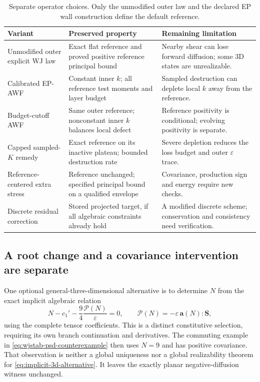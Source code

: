 \documentclass[11pt,a4paper]{article}
\numberwithin{equation}{section}
\newcommand{\eps}{\varepsilon}
\begin{document}
\begin{table}[htbp]
\centering\small
\begin{tabularx}{\textwidth}{@{}p{}XX@{}}
\toprule
Variant & Preserved property & Remaining limitation\\
\midrule
Unmodified outer explicit WJ law
& Exact flat reference and proved positive reference principal bound
& Nearby shear can lose forward diffusion; some 3D states are unrealizable.\\
Calibrated EP-AWF
& Constant inner $k$; all reference test moments and layer budget
& Sampled destruction can deplete local $k$ away from the reference.\\
Budget-cutoff AWF
& Same outer reference; nonconstant inner $k$ balances local defect
& Reference positivity is conditional; evolving positivity is separate.\\
Capped sampled-$K$ remedy
& Exact reference on its inactive plateau; bounded destruction rate
& Severe depletion reduces the loss budget and outer $\eps$ trace.\\
Reference-centered extra stress
& Reference unchanged; specified principal bound on a qualified envelope
& Covariance, production sign and energy require new checks.\\
Discrete residual correction
& Stored projected target, if all algebraic constraints already hold
& A modified discrete scheme; conservation and consistency need verification.\\
\bottomrule
\end{tabularx}
\caption{Separate operator choices. Only the unmodified outer law and
the declared EP wall construction define the default reference.}
\label{tab:variants}
\end{table}

\subsection{A root change and a covariance intervention are separate}
One optional general-three-dimensional alternative is to determine $N$
from the exact implicit algebraic relation
\begin{equation}
 N-c_1'-\frac94\frac{\mathcal P(N)}{\eps}=0,
 \qquad \mathcal P(N)=-\eps\,\bm a(N):\bm S,
 \label{eq:implicit-3d-alternative}
\end{equation}
using the complete tensor coefficients. This is a distinct constitutive
selection, requiring its own branch continuation and derivatives. The
commuting example in \cref{eq:wjstab-psd-counterexample} then uses $N=9$
and has positive covariance. That observation is neither a global
uniqueness nor a global realizability theorem for
\eqref{eq:implicit-3d-alternative}. It leaves the exactly planar
negative-diffusion witness unchanged.
\end{document}
